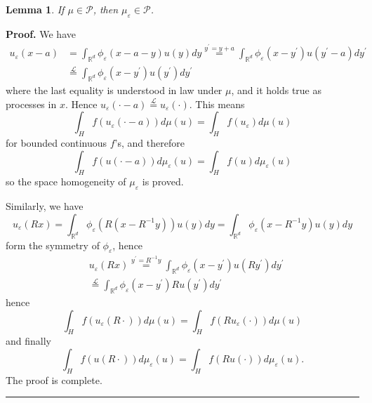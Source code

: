 \documentclass[11pt]{preprint}
\newtheorem{lemma}[theorem]{Lemma}
\newenvironment{proof}[1][Proof]{\textbf{#1.} }{\ \rule{0.5em}{0.5em}}
\begin{document}
\begin{lemma}
If $\mu\in\mathcal{P}$, then $\mu_{\varepsilon}\in\mathcal{P}$.
\end{lemma}

\begin{proof}
We have
\begin{align*}
u_{\varepsilon}\left(  x-a\right)   &  =\int_{\mathbb{R}^{d}}\phi
_{\varepsilon}\left(  x-a-y\right)  u\left(  y\right)  dy\overset{y^{\prime
}=y+a}{=}\int_{\mathbb{R}^{d}}\phi_{\varepsilon}\left(  x-y^{\prime}\right)
u\left(  y^{\prime}-a\right)  dy^{\prime}\\
&  \overset{\mathcal{L}}{=}\int_{\mathbb{R}^{d}}\phi_{\varepsilon}\left(
x-y^{\prime}\right)  u\left(  y^{\prime}\right)  dy^{\prime}%
\end{align*}
where the last equality is understood in law under $\mu$, and it holds true as
processes in $x$. Hence $u_{\varepsilon}\left(  \cdot-a\right)  \overset
{\mathcal{L}}{=}u_{\varepsilon}\left(  \cdot\right)  $. This means
\[
\int_{H}f\left(  u_{\varepsilon}\left(  \cdot-a\right)  \right)  d\mu\left(
u\right)  =\int_{H}f\left(  u_{\varepsilon}\right)  d\mu\left(  u\right)
\]
for bounded continuous $f$'s, and therefore
\[
\int_{H}f\left(  u\left(  \cdot-a\right)  \right)  d\mu_{\varepsilon}\left(
u\right)  =\int_{H}f\left(  u\right)  d\mu_{\varepsilon}\left(  u\right)
\]
so the space homogeneity of $\mu_{\varepsilon}$ is proved.

Similarly, we have
\[
u_{\varepsilon}\left(  Rx\right)  =\int_{\mathbb{R}^{d}}\phi_{\varepsilon
}\left(  R\left(  x-R^{-1}y\right)  \right)  u\left(  y\right)  dy=\int
_{\mathbb{R}^{d}}\phi_{\varepsilon}\left(  x-R^{-1}y\right)  u\left(
y\right)  dy
\]
form the symmetry of $\phi_{\varepsilon}$, hence
\begin{align*}
&  u_{\varepsilon}\left(  Rx\right)  \overset{y^{\prime}=R^{-1}y}{=}%
\int_{\mathbb{R}^{d}}\phi_{\varepsilon}\left(  x-y^{\prime}\right)  u\left(
Ry^{\prime}\right)  dy^{\prime}\\
&  \overset{\mathcal{L}}{=}\int_{\mathbb{R}^{d}}\phi_{\varepsilon}\left(
x-y^{\prime}\right)  Ru\left(  y^{\prime}\right)  dy^{\prime}%
\end{align*}
hence
\[
\int_{H}f\left(  u_{\varepsilon}\left(  R\cdot\right)  \right)  d\mu\left(
u\right)  =\int_{H}f\left(  Ru_{\varepsilon}(\cdot)\right)  d\mu\left(
u\right)
\]
and finally
\[
\int_{H}f\left(  u\left(  R\cdot\right)  \right)  d\mu_{\varepsilon}\left(
u\right)  =\int_{H}f\left(  Ru(\cdot)\right)  d\mu_{\varepsilon}\left(
u\right)  .
\]
The proof is complete.
\end{proof}
\end{document}
